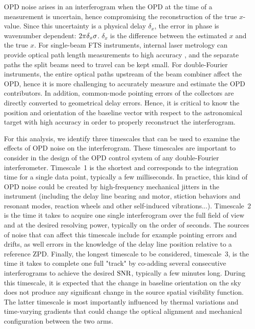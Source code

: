 OPD noise arises in an interferogram when the OPD at the time of a measurement is uncertain, hence compromising the reconstruction of the true $x$-value. Since this uncertainty is a physical delay $\delta_x$, 
the error in phase is wavenumber dependent: $2\pi\delta_x\sigma$. $\delta_x$ is the difference between the estimated $x$
and the true $x$.
For single-beam FTS instruments, internal laser metrology can provide optical path length 
measurements to high accuracy \citep[e.g.][]{Griffiths:2007uu}, and the separate paths the split beams need to travel can be kept small. 
For double-Fourier instruments, the entire optical paths upstream of the beam combiner affect the OPD, hence it is more challenging to accurately measure and estimate the OPD contributors. 
In addition, common-mode pointing errors of the collectors are directly converted to geometrical delay errors. 
Hence, it is critical to know the position and orientation of the baseline vector with respect to the 
astronomical target with high accuracy in order to properly reconstruct the interferogram.

For this analysis, we identify three timescales that can be used to examine the effects of OPD noise on the interferogram. These timescales are important to consider in the design of the OPD control system of any double-Fourier interferometer. Timescale~1 is the shortest and corresponds to the integration time for a single data point, typically a few milliseconds. In practice, this kind of OPD noise could be created by high-frequency mechanical jitters in the instrument (including the delay line bearing and motor, stiction behaviors and resonant modes, reaction wheels and other self-induced vibrations...). Timescale~2 is the time it takes to acquire one single interferogram over the full field of view and at the desired resolving power, typically on the order of seconds. The sources of noise that can affect this timescale include for example pointing errors and drifts, as well errors in the knowledge of the delay line position relative to
a reference ZPD. Finally, the longest timescale to be considered, timescale~3, is the time it takes to complete one full "track" by co-adding several consecutive interferograms to achieve the desired $\textrm{SNR}$, typically a few minutes long. During this timescale, it is expected that the change in baseline orientation on the sky does not produce any significant change in the source spatial visibility function. The latter timescale is most importantly influenced by thermal variations and time-varying gradients that could change the optical alignment and mechanical configuration between the two arms. 


